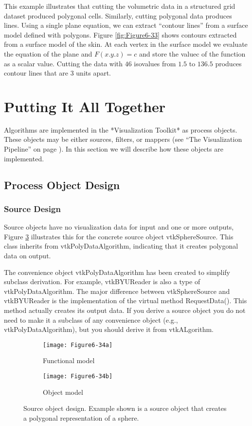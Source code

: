 This example illustrates that cutting the volumetric data in a structured grid dataset produced polygonal cells. Similarly, cutting polygonal data produces lines. Using a single plane equation, we can extract ``contour lines'' from a surface model defined with polygons. Figure \ref{fig:Figure6-33} shows contours extracted from a surface model of the skin. At each vertex in the surface model we evaluate the equation of the plane and $F(x.y.z) = c$ and store the valuec of the function as a scalar value. Cutting the data with $46$ isovalues from $1.5$ to $136.5$ produces contour lines that are $3$ units apart.



\section{Putting It All Together}

Algorithms are implemented in the *Visualization Toolkit* as process objects. These objects may be either sources, filters, or mappers (see ``The Visualization Pipeline'' on page \pageref{sec:visualization_pipeline} ). In this section we will describe how these objects are implemented.

\subsection{Process Object Design}

\subsubsection{Source Design}
Source objects have no visualization data for input and one or more outputs, Figure \ref{fig:Figure6-34} illustrates this for the concrete source object vtkSphereSource. This class inherits from vtkPolyDataAlgorithm, indicating that it creates polygonal data on output.

The convenience object vtkPolyDataAlgorithm has been created to simplify subclass derivation. For example, vtkBYUReader is also a type of vtkPolyDataAlgorithm. The major difference between vtkSphereSource and vtkBYUReader is the implementation of the virtual method RequestData(). This method actually creates its output data. If you derive a source object you do not need to make it a subclass of any convenience object (e.g., vtkPolyDataAlgorithm), but you should derive it from vtkALgorithm.

\begin{figure}[htb]
	\begin{subfigure}[h]{0.48\linewidth}
		\texttt{[image: Figure6-34a]}
		\caption{Functional model}
		\label{fig:Figure6-34a}
	\end{subfigure}
	\hfill
	\begin{subfigure}[h]{0.48\linewidth}
		\texttt{[image: Figure6-34b]}
		\caption{Object model}
		\label{fig:Figure6-34b}
	\end{subfigure}
	\caption{Source object design. Example shown is a source object that creates a polygonal representation of a sphere.}\label{fig:Figure6-34}
\end{figure}

